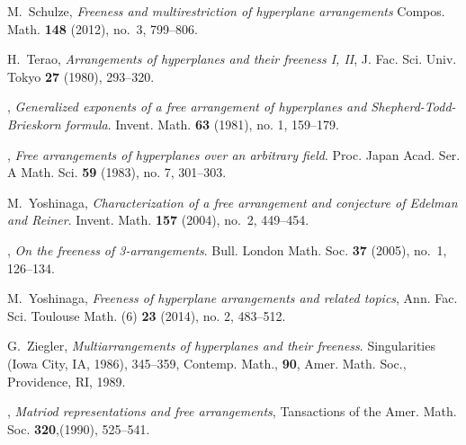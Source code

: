 \begin{thebibliography}{ATW07}
M.~Schulze, 
\emph{Freeness and multirestriction of hyperplane arrangements} 
Compos. Math. \textbf{148} (2012), no.~3, 799--806. 

H.~Terao, \emph{Arrangements of hyperplanes and
    their freeness I, II}, J. Fac. Sci.  Univ. Tokyo \textbf{27} (1980),
  293--320.

\bysame, 
\emph{Generalized exponents of a free arrangement of hyperplanes and Shepherd-Todd-Brieskorn formula}. Invent. Math. \textbf{63} (1981), no. 1, 159--179. 

\bysame, 
\emph{Free arrangements of hyperplanes over an arbitrary field}. 
Proc. Japan Acad. Ser. A Math. Sci. \textbf{59} (1983), no. 7, 301--303. 

M.~Yoshinaga,
\emph{Characterization of a free arrangement and conjecture of 
Edelman and Reiner}.
Invent. Math. \textbf{157} (2004), no.~2, 449--454. 

\bysame, 
\emph{On the freeness of 3-arrangements}. 
Bull. London Math. Soc. \textbf{37} (2005), no.~1, 126--134. 

M.~Yoshinaga,
\emph{Freeness of hyperplane arrangements and related topics}, 
 Ann. Fac. Sci. Toulouse Math. (6) \textbf{23} (2014), no. 2, 483--512.

G.~Ziegler, 
\emph{Multiarrangements of hyperplanes and their freeness}. 
Singularities (Iowa City, IA, 1986), 345--359,
Contemp. Math., \textbf{90}, Amer. Math. Soc., Providence, RI, 1989. 

\bysame, 
\emph{Matriod representations and free arrangements},
Tansactions of the Amer. Math. Soc. \textbf{320},(1990), 525--541.

\end{thebibliography}



